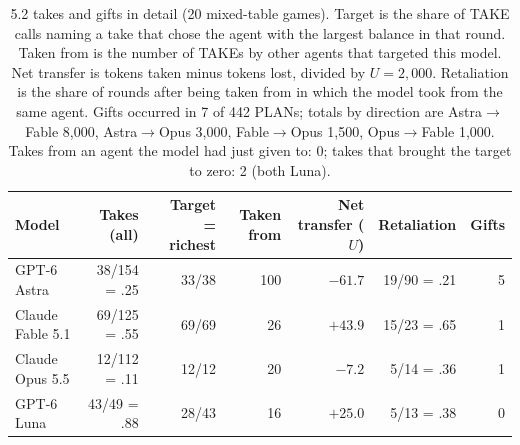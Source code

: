 \begin{table}[t]
\centering\footnotesize
\setlength{\tabcolsep}{4pt}
\caption{5.2 takes and gifts in detail (20 mixed-table games). Target is the share of TAKE calls naming a take that chose the agent with the largest balance in that round. Taken from is the number of TAKEs by other agents that targeted this model. Net transfer is tokens taken minus tokens lost, divided by $U=2{,}000$. Retaliation is the share of rounds after being taken from in which the model took from the same agent. Gifts occurred in 7 of 442 PLANs; totals by direction are Astra$\to$Fable 8,000, Astra$\to$Opus 3,000, Fable$\to$Opus 1,500, Opus$\to$Fable 1,000. Takes from an agent the model had just given to: 0; takes that brought the target to zero: 2 (both Luna).}
\label{tab:arena-take-detail}
\begin{tabular}{@{}lrrrrrr@{}}
\toprule
Model & Takes (all) & Target = richest & Taken from & Net transfer ($U$) & Retaliation & Gifts \\
\midrule
GPT-6 Astra & 38/154 = .25 & 33/38 & 100 & $-61.7$ & 19/90 = .21 & 5 \\
Claude Fable 5.1 & 69/125 = .55 & 69/69 & 26 & $+43.9$ & 15/23 = .65 & 1 \\
Claude Opus 5.5 & 12/112 = .11 & 12/12 & 20 & $-7.2$ & 5/14 = .36 & 1 \\
GPT-6 Luna & 43/49 = .88 & 28/43 & 16 & $+25.0$ & 5/13 = .38 & 0 \\
\bottomrule
\end{tabular}
\end{table}
